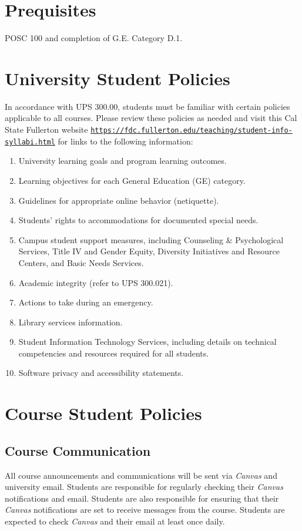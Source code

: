 \documentclass[12pt, letterpaper]{article}
\begin{document}
\section*{Prequisites}

POSC 100 and completion of G.E. Category D.1. 


\section{University Student Policies}

In accordance with UPS 300.00, students must be familiar with certain policies applicable to all courses. Please review these policies as needed and visit this Cal State Fullerton website \texttt{\href{https://fdc.fullerton.edu/teaching/student-info-syllabi.html}{https://fdc.fullerton.edu/teaching/student-info-syllabi.html}} for links to the following information:

\begin{enumerate}
    \item   University learning goals and program learning outcomes.
    \item	Learning objectives for each General Education (GE) category.
    \item	Guidelines for appropriate online behavior (netiquette).
    \item	Students’ rights to accommodations for documented special needs.
    \item   Campus student support measures, including Counseling \& Psychological Services, Title IV and Gender Equity, Diversity Initiatives and Resource Centers, and Basic Needs Services.
    \item	Academic integrity (refer to UPS 300.021).
    \item	Actions to take during an emergency.
    \item	Library services information.
    \item	Student Information Technology Services, including details on technical competencies and resources required for all students.
    \item	Software privacy and accessibility statements.
\end{enumerate}

\section*{Course Student Policies}

\subsection*{Course Communication}
All course announcements and communications will be sent via \emph{Canvas} and university email. Students are responsible for regularly checking their \emph{Canvas} notifications and email. Students are also responsible for ensuring that their \emph{Canvas} notifications are set to receive messages from the course. Students are expected to check \emph{Canvas} and their email at least once daily.
\end{document}
